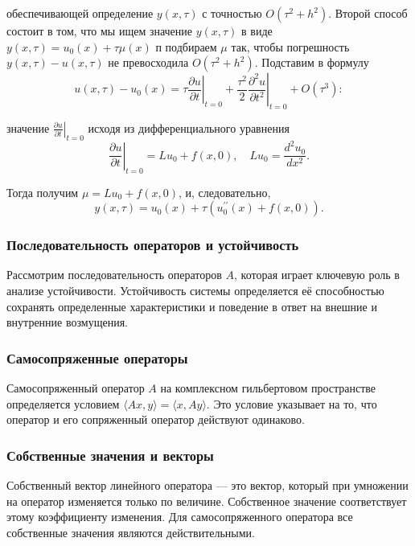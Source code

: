 обеспечивающей определение $y(x, \tau)$ с точностью $O\left(\tau^2+h^2\right)$. Второй способ состоит в том, что мы ищем значение $y(x, \tau)$ в виде $y(x, \tau)=u_0(x)+\tau \mu(x)$ п подбираем $\mu$ так, чтобы погрешность $y(x, \tau)-u(x, \tau)$ не превосходила $O\left(\tau^2+h^2\right)$. Подставим в формулу
$$
u(x, \tau)-u_0(x)=\left.\tau \frac{\partial u}{\partial t}\right|_{t=0}+\left.\frac{\tau^2}{2} \frac{\partial^2 u}{\partial t^2}\right|_{t=0}+O\left(\tau^3\right):
$$

значение $\left.\frac{\partial u}{\partial t}\right|_{t=0}$ исходя из дифференциального уравнения
$$
\left.\frac{\partial u}{\partial t}\right|_{t=0}=L u_0+f(x, 0), \quad L u_0=\frac{d^2 u_0}{d x^2} .
$$

Тогда получим $\mu=L u_0+f(x, 0)$, и, следовательно,
$$
y(x, \tau)=u_0(x)+\tau\left(u_0^{\prime \prime}(x)+f(x, 0)\right) .
$$

\subsubsection*{Последовательность операторов и устойчивость}

Рассмотрим последовательность операторов \(A\), которая играет ключевую роль в анализе устойчивости. Устойчивость системы определяется её способностью сохранять определенные характеристики и поведение в ответ на внешние и внутренние возмущения.

\subsubsection*{Самосопряженные операторы}

Самосопряженный оператор \(A\) на комплексном гильбертовом пространстве определяется условием \(\langle Ax, y \rangle = \langle x, Ay \rangle\). Это условие указывает на то, что оператор и его сопряженный оператор действуют одинаково.

\subsubsection*{Собственные значения и векторы}

Собственный вектор линейного оператора — это вектор, который при умножении на оператор изменяется только по величине. Собственное значение соответствует этому коэффициенту изменения. Для самосопряженного оператора все собственные значения являются действительными.


